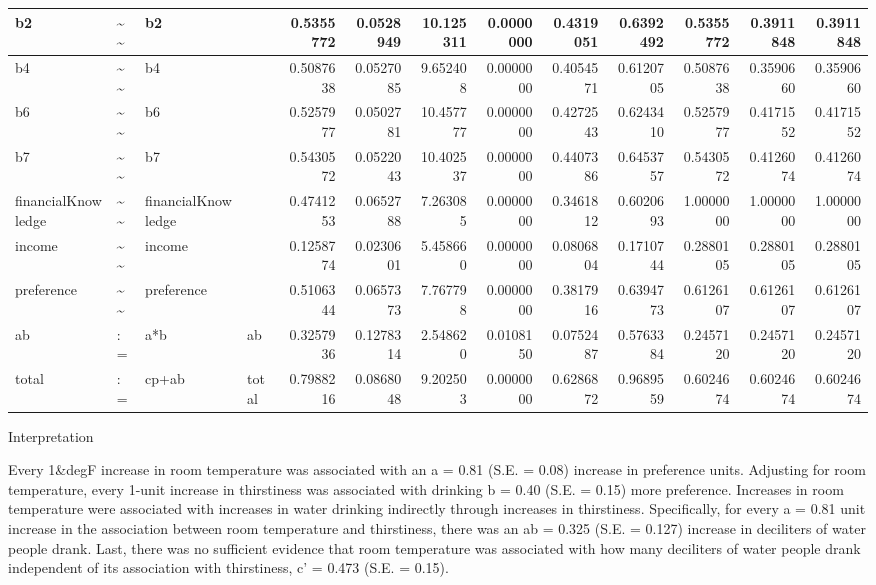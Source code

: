 \documentclass[
  super,
  preprint,
  3p]{elsarticle}
\begin{document}
\begin{tabular}{l|l|l|l|r|r|r|r|r|r|r|r|r}
\hline
b2 & \textasciitilde{}\textasciitilde{} & b2 &  & 0.5355772 & 0.0528949 & 10.125311 & 0.0000000 & 0.4319051 & 0.6392492 & 0.5355772 & 0.3911848 & 0.3911848\\
\hline
b4 & \textasciitilde{}\textasciitilde{} & b4 &  & 0.5087638 & 0.0527085 & 9.652408 & 0.0000000 & 0.4054571 & 0.6120705 & 0.5087638 & 0.3590660 & 0.3590660\\
\hline
b6 & \textasciitilde{}\textasciitilde{} & b6 &  & 0.5257977 & 0.0502781 & 10.457777 & 0.0000000 & 0.4272543 & 0.6243410 & 0.5257977 & 0.4171552 & 0.4171552\\
\hline
b7 & \textasciitilde{}\textasciitilde{} & b7 &  & 0.5430572 & 0.0522043 & 10.402537 & 0.0000000 & 0.4407386 & 0.6453757 & 0.5430572 & 0.4126074 & 0.4126074\\
\hline
financialKnowledge & \textasciitilde{}\textasciitilde{} & financialKnowledge &  & 0.4741253 & 0.0652788 & 7.263085 & 0.0000000 & 0.3461812 & 0.6020693 & 1.0000000 & 1.0000000 & 1.0000000\\
\hline
income & \textasciitilde{}\textasciitilde{} & income &  & 0.1258774 & 0.0230601 & 5.458660 & 0.0000000 & 0.0806804 & 0.1710744 & 0.2880105 & 0.2880105 & 0.2880105\\
\hline
preference & \textasciitilde{}\textasciitilde{} & preference &  & 0.5106344 & 0.0657373 & 7.767798 & 0.0000000 & 0.3817916 & 0.6394773 & 0.6126107 & 0.6126107 & 0.6126107\\
\hline
ab & := & a*b & ab & 0.3257936 & 0.1278314 & 2.548620 & 0.0108150 & 0.0752487 & 0.5763384 & 0.2457120 & 0.2457120 & 0.2457120\\
\hline
total & := & cp+ab & total & 0.7988216 & 0.0868048 & 9.202503 & 0.0000000 & 0.6286872 & 0.9689559 & 0.6024674 & 0.6024674 & 0.6024674\\
\hline
\end{tabular}

Interpretation

Every 1\&degF increase in room temperature was associated with an a =
0.81 (S.E. = 0.08) increase in preference units. Adjusting for room
temperature, every 1-unit increase in thirstiness was associated with
drinking b = 0.40 (S.E. = 0.15) more preference. Increases in room
temperature were associated with increases in water drinking indirectly
through increases in thirstiness. Specifically, for every a = 0.81 unit
increase in the association between room temperature and thirstiness,
there was an ab = 0.325 (S.E. = 0.127) increase in deciliters of water
people drank. Last, there was no sufficient evidence that room
temperature was associated with how many deciliters of water people
drank independent of its association with thirstiness, c' = 0.473 (S.E.
= 0.15).
\end{document}
